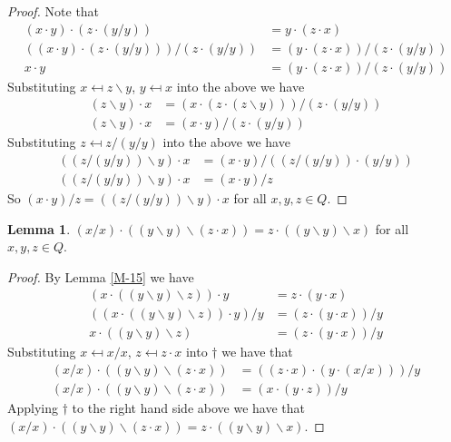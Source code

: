 \documentclass[12pt, twoside, openright]{report}
\theoremstyle{definition}
\newtheorem{lem}[thm]{Lemma}
\newcommand{\ldv}{\backslash}       %
\begin{document}
\begin{proof}
  Note that
  \begin{align*}
    (x\cdot y)\cdot (z\cdot(y/y)) &= y\cdot (z\cdot x)\\
    ((x\cdot y)\cdot (z\cdot(y/y)))/(z\cdot(y/y)) &= (y\cdot (z\cdot x))/(z\cdot(y/y))\\
    x\cdot y &= (y\cdot (z\cdot x))/(z\cdot(y/y))
  \end{align*}
  Substituting $x \mapsfrom z\ldv y$, $y \mapsfrom x$ into the above we have
  \begin{align*}
    (z\ldv y)\cdot x &= (x\cdot (z\cdot (z\ldv y)))/(z\cdot(y/y))\\
    (z\ldv y)\cdot x &= (x\cdot y)/(z\cdot(y/y))
  \end{align*}
  Substituting $z \mapsfrom z/(y/y)$ into the above we have
  \begin{align*}
    ((z/(y/y))\ldv y)\cdot x &= (x\cdot y)/((z/(y/y))\cdot (y/y))\\
    ((z/(y/y))\ldv y)\cdot x &= (x\cdot y)/z
  \end{align*}
  So $(x\cdot y)/z = ((z/(y/y))\ldv y)\cdot x$ for all $x, y, z\in Q$.
\end{proof}

\begin{lem}\label{M-30}
  $(x/x)\cdot ((y\ldv y)\ldv (z\cdot x)) = z\cdot((y\ldv y)\ldv x)$ for all $x, y, z\in Q$.
\end{lem}

\begin{proof}
  By Lemma \ref{M-15} we have
  \begin{align*}
    (x\cdot ((y\ldv y)\ldv z))\cdot y &= z\cdot(y\cdot x)\\
    ((x\cdot ((y\ldv y)\ldv z))\cdot y)/y &= (z\cdot(y\cdot x))/y\\
    x\cdot((y\ldv y)\ldv z) &= (z\cdot(y\cdot x))/y \tag{$\dagger$}
  \end{align*}
  Substituting $x \mapsfrom x/x$, $z \mapsfrom z\cdot x$ into $\dagger$ we have that
  \begin{align*}
    (x/x)\cdot ((y\ldv y)\ldv (z\cdot x)) &= ((z\cdot x)\cdot (y\cdot (x/x)))/y\\
    (x/x)\cdot ((y\ldv y)\ldv (z\cdot x)) &= (x\cdot(y\cdot z))/y
  \end{align*}
  Applying $\dagger$ to the right hand side above we have that
    $(x/x)\cdot ((y\ldv y)\ldv (z\cdot x)) = z\cdot((y\ldv y)\ldv x)$.
\end{proof}
\end{document}
